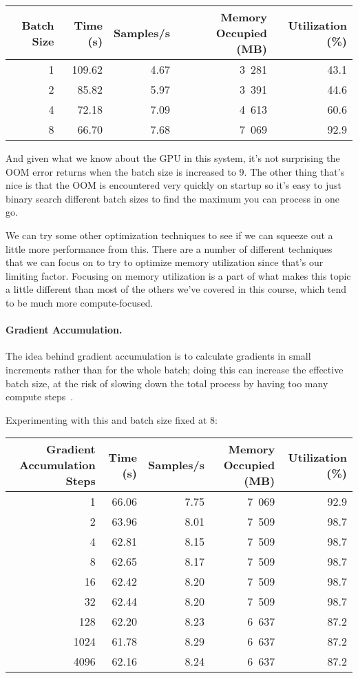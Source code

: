 \begin{center}
\begin{tabular}{r|r|r|r|r}
\textbf{Batch Size} & \textbf{Time (s)} & \textbf{Samples/s} & \textbf{Memory Occupied (MB)} & \textbf{Utilization (\%)} \\ \hline
1 & 109.62 & 4.67 & 3~281 & 43.1 \\
2 & 85.82 & 5.97 & 3~391 & 44.6 \\
4 & 72.18 & 7.09 & 4~613 & 60.6 \\
8 & 66.70 & 7.68 & 7~069 & 92.9 \\
\end{tabular}
\end{center}

And given what we know about the GPU in this system, it's not surprising the OOM error returns when the batch size is increased to 9. The other thing that's nice is that the OOM is encountered very quickly on startup so it's easy to just binary search different batch sizes to find the maximum you can process in one go. 

We can try some other optimization techniques to see if we can squeeze out a little more performance from this. There are a number of different techniques that we can focus on to try to optimize memory utilization since that's our limiting factor. Focusing on memory utilization is a part of what makes this topic a little different than most of the others we've covered in this course, which tend to be much more compute-focused. 

\paragraph{Gradient Accumulation.} The idea behind gradient accumulation is to calculate gradients in small increments rather than for the whole batch; doing this can increase the effective batch size, at the risk of slowing down the total process by having too many compute steps~\cite{hf}.

Experimenting with this and batch size fixed at 8:

\begin{center}
\begin{tabular}{r|r|r|r|r}
\textbf{Gradient Accumulation Steps} & \textbf{Time (s)} & \textbf{Samples/s} & \textbf{Memory Occupied (MB)} & \textbf{Utilization (\%)} \\ \hline
1 & 66.06 & 7.75 & 7~069 & 92.9 \\
2 & 63.96 & 8.01 & 7~509 & 98.7 \\
4 & 62.81 & 8.15 & 7~509 & 98.7 \\
8 & 62.65 & 8.17 & 7~509 & 98.7 \\
16 & 62.42 & 8.20 & 7~509 & 98.7 \\
32 & 62.44 & 8.20 & 7~509 & 98.7\\
128 & 62.20 & 8.23 & 6~637 & 87.2\\
1024 & 61.78 & 8.29 & 6~637 & 87.2 \\
4096 & 62.16 & 8.24 & 6~637 & 87.2
\end{tabular}
\end{center}

